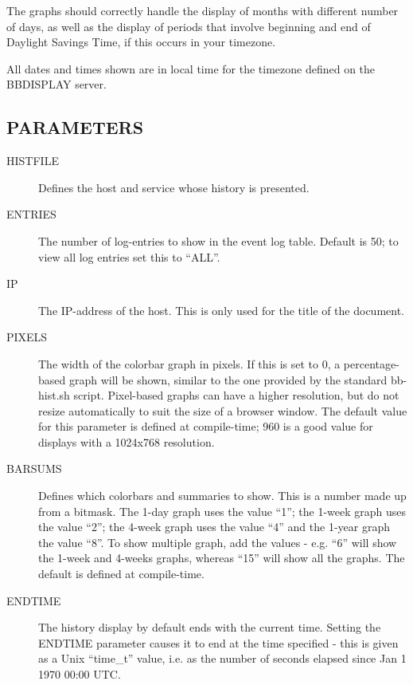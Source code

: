   The graphs should correctly handle the display of months with
  different number of days, as well as the display of periods that
  involve beginning and end of Daylight Savings Time, if this occurs
  in your timezone. 



  All dates and times shown are in local time for the timezone defined on the BBDISPLAY server. 


 


 
\subsection{PARAMETERS}
\begin{description}

\item[HISTFILE] Defines the host and service whose history is
  presented. 

\item[ENTRIES] The number of log-entries to show in the event log
  table. Default is 50; to view all log entries set this to ``ALL''. 

\item[IP] The IP-address of the host. This is only used for the title
  of the document. 

\item[PIXELS] The width of the colorbar graph in pixels. If this is
  set to 0, a percentage-based graph will be shown, similar to the one
  provided by the standard bb-hist.sh script. Pixel-based graphs can
  have a higher resolution, but do not resize automatically to suit
  the size of a browser window. The default value for this parameter
  is defined at compile-time; 960 is a good value for displays with a
  1024x768 resolution. 

\item[BARSUMS] Defines which colorbars and summaries to show. This is
  a number made up from a bitmask. The 1-day graph uses the value
  ``1''; the 1-week graph uses the value ``2''; the 4-week graph uses
  the value ``4'' and the 1-year graph the value ``8''. To show
  multiple graph, add the values - e.g. ``6'' will show the 1-week and
  4-weeks graphs, whereas ``15'' will show all the graphs. The default
  is defined at compile-time. 

\item[ENDTIME] The history display by default ends with the current
  time. Setting the ENDTIME parameter causes it to end at the time
  specified - this is given as a Unix ``time\_t'' value, i.e. as the
  number of seconds elapsed since Jan 1 1970 00:00 UTC. 


 


\end{description}
